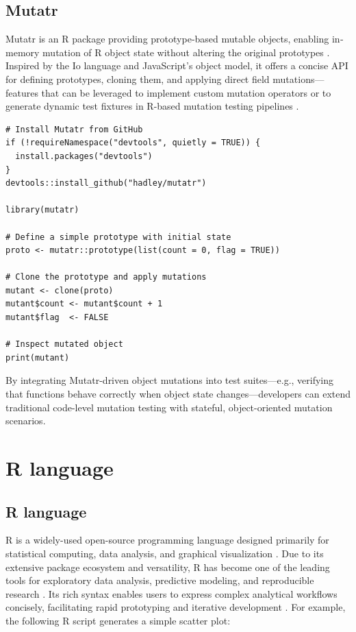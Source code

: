 \subsection{Mutatr}

Mutatr is an R package providing prototype‐based mutable objects, enabling in‐memory mutation of R object state without altering the original prototypes \cite{wickham_mutatr}. Inspired by the Io language and JavaScript’s object model, it offers a concise API for defining prototypes, cloning them, and applying direct field mutations—features that can be leveraged to implement custom mutation operators or to generate dynamic test fixtures in R-based mutation testing pipelines \cite{iolanguage}.

\begin{verbatim}
# Install Mutatr from GitHub
if (!requireNamespace("devtools", quietly = TRUE)) {
  install.packages("devtools")
}
devtools::install_github("hadley/mutatr")

library(mutatr)

# Define a simple prototype with initial state
proto <- mutatr::prototype(list(count = 0, flag = TRUE))

# Clone the prototype and apply mutations
mutant <- clone(proto)
mutant$count <- mutant$count + 1
mutant$flag  <- FALSE

# Inspect mutated object
print(mutant)
\end{verbatim}

By integrating Mutatr-driven object mutations into test suites—e.g., verifying that functions behave correctly when object state changes—developers can extend traditional code-level mutation testing with stateful, object-oriented mutation scenarios.

\section{R language}

\subsection{R language}

R is a widely-used open-source programming language designed primarily for statistical computing, data analysis, and graphical visualization \cite{R-base}. Due to its extensive package ecosystem and versatility, R has become one of the leading tools for exploratory data analysis, predictive modeling, and reproducible research \cite{wickham2014advanced}. Its rich syntax enables users to express complex analytical workflows concisely, facilitating rapid prototyping and iterative development \cite{wickham2019r4ds}. For example, the following R script generates a simple scatter plot:

